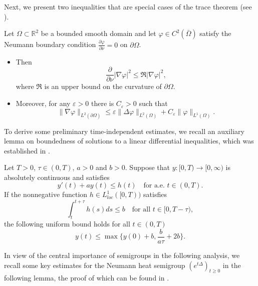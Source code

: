 \documentclass[reqno]{amsart}
\begin{document}
Next, we present two inequalities that are special cases of the trace theorem 
(see \cite{ma-13}).

\begin{lemma} \label{lem2.2}
Let $\Omega \subset \mathbb{R}^2$  be a bounded smooth domain and let 
$\varphi \in C^2(\bar{\Omega})$ satisfy the Neumann
boundary condition $\frac{\partial \varphi}{\partial \nu} = 0$
on $\partial \Omega$.
\begin{itemize}
\item[(i)] Then
\begin{equation}\label{9.12-3}
\frac{\partial}{\partial\nu }|\nabla \varphi|^2 
\leq \mathfrak{R} |\nabla \varphi|^2,
\end{equation}
where $\mathfrak{R}$ is an upper bound on the curvature of 
$\partial \Omega$.

\item[(ii)] Moreover, for any $\varepsilon > 0$ there is $C_\varepsilon> 0$ such that
\begin{equation}\label{9.12-4}
\|\nabla \varphi\|_{L^2(\partial \Omega)} \leq \varepsilon\|\Delta \varphi\|_{L^2(\Omega)}+C_\varepsilon \|\varphi\|_{L^1(\Omega)}.
\end{equation}
\end{itemize}
\end{lemma}

To derive some preliminary time-independent estimates, we recall an auxiliary lemma 
on boundedness of solutions to a linear differential inequalities,
which was established in \cite{ma-19}.

\begin{lemma}\label{lem2.4}
Let $T>0$, $\tau\in(0,T)$, $a > 0$ and $b>0$. Suppose that $y:[0,T)\to[0,\infty)$ 
is absolutely continuous and satisfies
\[
y'(t)+a y(t)\leq h(t)\quad\text{for a.e. }t\in(0,T).
\]
If the nonnegative function $h\in L^1_{loc}([0,T))$ satisfies
\[
\int_{t}^{t + \tau}h(s)ds\leq b\quad\text{for all }t\in[0,T-\tau),
\]
the following uniform bound holds for all $t\in(0,T)$
\[
y(t)\leq\max\big\{y(0)+b,\frac{b}{a\tau}+2b\big\}.
\]
\end{lemma}

In view of the central importance of semigroups in the following analysis, we recall 
some key estimates for the Neumann heat semigroup
$(e^{t\Delta})_{t\geq0}$ in the following lemma, the proof of which can be found 
in \cite{Cao2015, Horstmann2005,G-10}.
\end{document}
